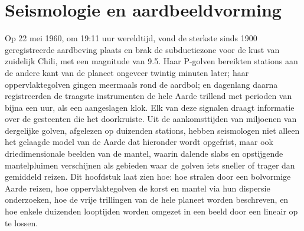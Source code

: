 \chapter{Seismologie en aardbeeldvorming}\label{ch:b3:seismology-imaging}

Op 22 mei 1960, om 19:11 uur wereldtijd, vond de sterkste sinds 1900 geregistreerde
aardbeving plaats en brak de subductiezone voor de kust van zuidelijk Chili, met een magnitude van 9.5.
Haar P-golven bereikten stations aan de andere kant van de planeet ongeveer twintig minuten
later; haar oppervlaktegolven gingen meermaals rond de aardbol; en
dagenlang daarna registreerden de traagste instrumenten de hele Aarde trillend met
perioden van bijna een uur, als een aangeslagen klok. Elk van deze signalen draagt
informatie over de gesteenten die het doorkruiste. Uit de aankomsttijden van miljoenen
van dergelijke golven, afgelezen op duizenden stations, hebben seismologen niet alleen
het gelaagde model van de Aarde dat hieronder wordt opgefrist, maar ook driedimensionale beelden van
de mantel, waarin dalende slabs en opstijgende mantelpluimen verschijnen als gebieden waar
de golven iets sneller of trager dan gemiddeld reizen. Dit hoofdstuk laat zien hoe:
hoe stralen door een bolvormige Aarde reizen, hoe oppervlaktegolven de korst
en mantel via hun dispersie onderzoeken, hoe de vrije trillingen van de hele
planeet worden beschreven, en hoe enkele duizenden looptijden worden omgezet
in een beeld door een lineair  op te lossen.

